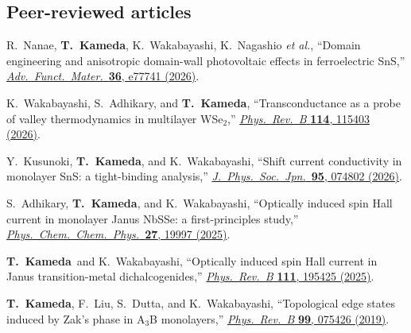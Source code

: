 \documentclass[10pt,a4paper]{article}
\newcommand{\me}{\textbf{T.~Kameda}}
\begin{document}
\subsection{Peer-reviewed articles}
\begin{enumerate}[label={[\arabic*]},leftmargin=7mm]
\item R.~Nanae, \me, K.~Wakabayashi, K.~Nagashio \textit{et al.}, ``Domain engineering and anisotropic domain-wall photovoltaic effects in ferroelectric SnS,'' \href{https://doi.org/10.1002/adfm.77741}{\textit{Adv.\ Funct.\ Mater.}\ \textbf{36}, e77741 (2026)}.
\item K.~Wakabayashi, S.~Adhikary, and \me, ``Transconductance as a probe of valley thermodynamics in multilayer WSe$_2$,'' \href{https://doi.org/10.1103/xsr9-l7ll}{\textit{Phys.\ Rev.\ B} \textbf{114}, 115403 (2026)}.
\item Y.~Kusunoki, \me, and K.~Wakabayashi, ``Shift current conductivity in monolayer SnS: a tight-binding analysis,'' \href{https://doi.org/10.7566/JPSJ.95.074802}{\textit{J.\ Phys.\ Soc.\ Jpn.}\ \textbf{95}, 074802 (2026)}.
\item S.~Adhikary, \me, and K.~Wakabayashi, ``Optically induced spin Hall current in monolayer Janus NbSSe: a first-principles study,'' \href{https://doi.org/10.1039/D5CP02135A}{\textit{Phys.\ Chem.\ Chem.\ Phys.}\ \textbf{27}, 19997 (2025)}.
\item \me\ and K.~Wakabayashi, ``Optically induced spin Hall current in Janus transition-metal dichalcogenides,'' \href{https://doi.org/10.1103/PhysRevB.111.195425}{\textit{Phys.\ Rev.\ B} \textbf{111}, 195425 (2025)}.
\item \me, F.~Liu, S.~Dutta, and K.~Wakabayashi, ``Topological edge states induced by Zak's phase in A$_3$B monolayers,'' \href{https://doi.org/10.1103/PhysRevB.99.075426}{\textit{Phys.\ Rev.\ B} \textbf{99}, 075426 (2019)}.
\end{enumerate}
\end{document}
